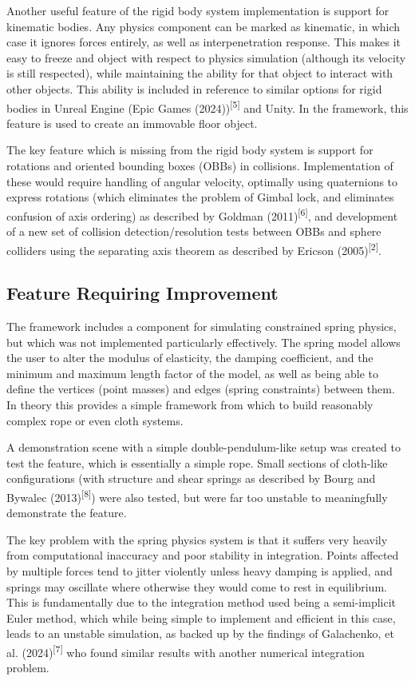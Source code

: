 \documentclass[
]{article}
\begin{document}
Another useful feature of the rigid body system implementation is
support for kinematic bodies. Any physics component can be marked as
kinematic, in which case it ignores forces entirely, as well as
interpenetration response. This makes it easy to
\textquotesingle freeze\textquotesingle{} and object with respect to
physics simulation (although it\textquotesingle s velocity is still
respected), while maintaining the ability for that object to interact
with other objects. This ability is included in reference to similar
options for rigid bodies in Unreal Engine (Epic Games
(2024))\textsuperscript{{[}5{]}} and Unity. In the framework, this
feature is used to create an immovable floor object.

The key feature which is missing from the rigid body system is support
for rotations and oriented bounding boxes (OBBs) in collisions.
Implementation of these would require handling of angular velocity,
optimally using quaternions to express rotations (which eliminates the
problem of Gimbal lock, and eliminates confusion of axis ordering) as
described by Goldman (2011)\textsuperscript{{[}6{]}}, and development of
a new set of collision detection/resolution tests between OBBs and
sphere colliders using the separating axis theorem as described by
Ericson (2005)\textsuperscript{{[}2{]}}.

\subsection{Feature Requiring
Improvement}\label{feature-requiring-improvement}

The framework includes a component for simulating constrained spring
physics, but which was not implemented particularly effectively. The
spring model allows the user to alter the modulus of elasticity, the
damping coefficient, and the minimum and maximum length factor of the
model, as well as being able to define the vertices (point masses) and
edges (spring constraints) between them. In theory this provides a
simple framework from which to build reasonably complex rope or even
cloth systems.

A demonstration scene with a simple double-pendulum-like setup was
created to test the feature, which is essentially a simple rope. Small
sections of cloth-like configurations (with structure and shear springs
as described by Bourg and Bywalec (2013)\textsuperscript{{[}8{]}}) were
also tested, but were far too unstable to meaningfully demonstrate the
feature.

The key problem with the spring physics system is that it suffers very
heavily from computational inaccuracy and poor stability in integration.
Points affected by multiple forces tend to jitter violently unless heavy
damping is applied, and springs may oscillate where otherwise they would
come to rest in equilibrium. This is fundamentally due to the
integration method used being a semi-implicit Euler method, which while
being simple to implement and efficient in this case, leads to an
unstable simulation, as backed up by the findings of Galachenko, et al.
(2024)\textsuperscript{{[}7{]}} who found similar results with another
numerical integration problem.
\end{document}
